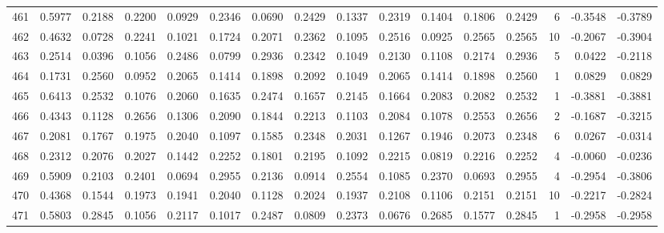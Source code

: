 \begin{tabular}{lrrrrrrrrrrrrrrr}
461 &      0.5977 &  0.2188 &  0.2200 &  0.0929 &  0.2346 &  0.0690 &  0.2429 &  0.1337 &  0.2319 &  0.1404 &   0.1806 &     0.2429 &      6 &                   -0.3548 &                    -0.3789 \\
462 &      0.4632 &  0.0728 &  0.2241 &  0.1021 &  0.1724 &  0.2071 &  0.2362 &  0.1095 &  0.2516 &  0.0925 &   0.2565 &     0.2565 &     10 &                   -0.2067 &                    -0.3904 \\
463 &      0.2514 &  0.0396 &  0.1056 &  0.2486 &  0.0799 &  0.2936 &  0.2342 &  0.1049 &  0.2130 &  0.1108 &   0.2174 &     0.2936 &      5 &                    0.0422 &                    -0.2118 \\
464 &      0.1731 &  0.2560 &  0.0952 &  0.2065 &  0.1414 &  0.1898 &  0.2092 &  0.1049 &  0.2065 &  0.1414 &   0.1898 &     0.2560 &      1 &                    0.0829 &                     0.0829 \\
465 &      0.6413 &  0.2532 &  0.1076 &  0.2060 &  0.1635 &  0.2474 &  0.1657 &  0.2145 &  0.1664 &  0.2083 &   0.2082 &     0.2532 &      1 &                   -0.3881 &                    -0.3881 \\
466 &      0.4343 &  0.1128 &  0.2656 &  0.1306 &  0.2090 &  0.1844 &  0.2213 &  0.1103 &  0.2084 &  0.1078 &   0.2553 &     0.2656 &      2 &                   -0.1687 &                    -0.3215 \\
467 &      0.2081 &  0.1767 &  0.1975 &  0.2040 &  0.1097 &  0.1585 &  0.2348 &  0.2031 &  0.1267 &  0.1946 &   0.2073 &     0.2348 &      6 &                    0.0267 &                    -0.0314 \\
468 &      0.2312 &  0.2076 &  0.2027 &  0.1442 &  0.2252 &  0.1801 &  0.2195 &  0.1092 &  0.2215 &  0.0819 &   0.2216 &     0.2252 &      4 &                   -0.0060 &                    -0.0236 \\
469 &      0.5909 &  0.2103 &  0.2401 &  0.0694 &  0.2955 &  0.2136 &  0.0914 &  0.2554 &  0.1085 &  0.2370 &   0.0693 &     0.2955 &      4 &                   -0.2954 &                    -0.3806 \\
470 &      0.4368 &  0.1544 &  0.1973 &  0.1941 &  0.2040 &  0.1128 &  0.2024 &  0.1937 &  0.2108 &  0.1106 &   0.2151 &     0.2151 &     10 &                   -0.2217 &                    -0.2824 \\
471 &      0.5803 &  0.2845 &  0.1056 &  0.2117 &  0.1017 &  0.2487 &  0.0809 &  0.2373 &  0.0676 &  0.2685 &   0.1577 &     0.2845 &      1 &                   -0.2958 &                    -0.2958 \\

\end{tabular}
